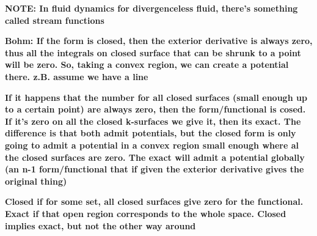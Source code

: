 \documentclass{book}
\begin{document}
\textbf{NOTE: In fluid dynamics for divergenceless fluid, there's something called stream functions}

\textbf{Bohm: If the form is closed, then the exterior derivative is always zero, thus all the integrals on closed surface that can be shrunk to a point will be zero. So, taking a convex region, we can create a potential there. z.B. assume we have a line}

\textbf{If it happens that the number for all closed surfaces (small enough up to a certain point) are always zero, then the form/functional is cosed. If it's zero on all the closed k-surfaces we give it, then its exact. The difference is that both admit potentials, but the closed form is only going to admit a potential in a convex region small enough where al the closed surfaces are zero. The exact will admit a potential globally (an n-1 form/functional that if given the exterior derivative gives the original thing)}

\textbf{Closed if for some set, all closed surfaces give zero for the functional. Exact if that open region corresponds to the whole space. Closed implies exact, but not the other way around}
\end{document}
